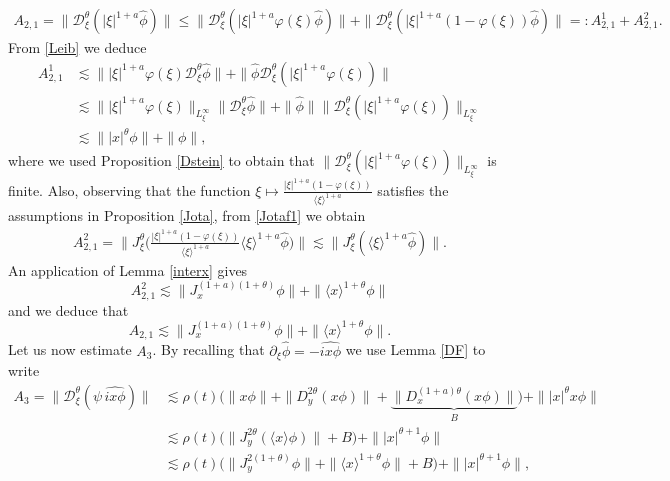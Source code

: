 \documentclass[reqno]{amsart}
\newcommand{\ha}{\hat{\phi}}
\newcommand{\lan}{\langle \xi \rangle}
\newcommand{\lanx}{\langle x \rangle}
\newcommand{\Dt}{\mathcal{D}^{\theta}_\xi}
\numberwithin{equation}{section}
\begin{document}
\begin{equation*}
\begin{split}
A_{2,1}=\|\mathcal{D}_\xi^\theta(|\xi|^{1+a}\hat{\phi})\| \leq \|\Dt(|\xi|^{1+a}\varphi(\xi)\ha)\|+\|\Dt(|\xi|^{1+a}(1-\varphi(\xi))\ha)\|
=:A_{2,1}^1+A_{2,1}^2.
\end{split}
\end{equation*}
From \eqref{Leib} we deduce 
 \begin{equation}
\begin{split}\label{A21}
A_{2,1}^1 & \lesssim \||\xi|^{1+a} \varphi(\xi)\Dt \ha\|+\|\ha \Dt (|\xi|^{1+a}\varphi(\xi))\|\\
& \lesssim \||\xi|^{1+a}\varphi(\xi)\|_{L^\infty_\xi} \|\Dt \ha\|+\|\ha\|\|\Dt (|\xi|^{1+a}\varphi(\xi))\|_{L^\infty_\xi}\\
&\lesssim \||x|^\theta\phi\|+\|\phi\|,
\end{split}
\end{equation}
where we used Proposition \ref{Dstein} to obtain that $\|\Dt (|\xi|^{1+a}\varphi(\xi))\|_{L^\infty_\xi}$ is finite.
Also, observing that the function $\xi\mapsto \frac{|\xi|^{1+a}(1-\varphi(\xi))}{\langle \xi \rangle^{1+a}}$ satisfies the assumptions in Proposition \ref{Jota}, from \eqref{Jotaf1} we obtain
\begin{equation}
\begin{split}\label{A211}
A_{2,1}^2=\Big\|J_\xi^\theta \Big( \frac{|\xi|^{1+a}(1-\varphi(\xi))}{\langle \xi \rangle^{1+a}}\langle \xi \rangle^{1+a}\ha\Big)\Big\|
\lesssim \|J_\xi^\theta (\lan^{1+a}\ha)\|.
\end{split}
\end{equation}
An application of Lemma \ref{interx} gives
$$
A_{2,1}^2\lesssim \|J_x^{(1+a)(1+\theta)}\phi\|+\|\lanx^{1+\theta}\phi\|
$$
and we deduce that
\begin{equation}\label{A21estimate}
A_{2,1}\lesssim  \|J_x^{(1+a)(1+\theta)}\phi\|+\|\lanx^{1+\theta}\phi\|.
\end{equation}
Let us now estimate $A_3$. By recalling that $\partial_{\xi}\hat{\phi}=-\widehat{ix\phi}$  we use Lemma \ref{DF} to  write
\begin{equation*}
\begin{split}
A_3 =\|\mathcal{D}_\xi^\theta(\psi\, \widehat{ix\phi})\|& \lesssim  \rho(t) \Big(\|x\phi\|+\|D^{2\theta}_y(x\phi)\|+\underbrace{\|D_x^{(1+a)\theta} (x\phi)\|}_{B}\Big)+\||x|^\theta x \phi\|\\
&\lesssim  \rho(t)\Big(\|J_y^{2\theta}(\lanx\phi)\|+B \Big)+\||x|^{\theta+1} \phi\|\\
&\lesssim  \rho(t)\Big(\|J_y^{2(1+\theta)}\phi\|+\|\lanx^{1+\theta}\phi\|+B \Big)+\||x|^{\theta+1}  \phi\|,
\end{split}
\end{equation*}
\end{document}
